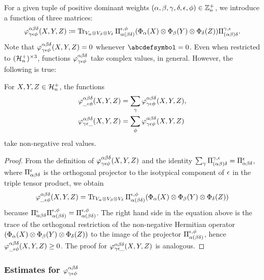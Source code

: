 \documentclass[notitlepage, 11pt, letterpaper]{amsart}
\begin{document}
For a given tuple of positive dominant weights $(\alpha,\beta,\gamma,\delta,\epsilon,\phi) \in \mathbb Z^{+}_{n}$, we introduce a function of three matrices:
\begin{equation}
    \varphi^{\alpha \beta \delta}_{\gamma \epsilon \phi}(X, Y, Z)
    \coloneqq
    \operatorname{Tr}_{V_\alpha \otimes V_\beta \otimes V_\delta}
    \Pi_{\alpha (\beta \delta)}^{\epsilon, \phi} (\Phi_\alpha(X) \otimes \Phi_\beta(Y) \otimes \Phi_\delta(Z))\Pi_{(\alpha \beta) \delta}^{\gamma, \epsilon}.
\end{equation}
Note that $\varphi^{\alpha \beta \delta}_{\gamma \epsilon \phi}(X,Y,Z) = 0$ whenever $\abcdefsymbol = 0$.
Even when restricted to $(\mathcal H^{+}_{n})^{\times 3}$, functions $\varphi^{\alpha \beta \delta}_{\gamma \epsilon \phi}$ take complex values, in general.
However, the following is true:
\begin{prop}
    \label{prop:non_neg_partial}
    For $X,Y,Z \in \mathcal H^{+}_{n}$, the functions
    \begin{align}
        \begin{split}
            \varphi^{\alpha\beta\delta}_{\_ \epsilon\phi}(X,Y,Z) & = \sum_{\gamma}\varphi^{\alpha\beta\delta}_{\gamma\epsilon\phi}(X,Y,Z), \\
            \varphi^{\alpha\beta\delta}_{\gamma\epsilon \_}(X,Y,Z) & = \sum_{\phi}\varphi^{\alpha\beta\delta}_{\gamma\epsilon\phi}(X,Y,Z)
        \end{split}
    \end{align}
    take non-negative real values.
\end{prop}
\begin{proof}
    From the definition of $\varphi^{\alpha \beta \delta}_{\gamma \epsilon \phi}(X, Y, Z)$ and the identity $\sum_\gamma \Pi_{(\alpha \beta) \delta}^{\gamma, \epsilon} = \Pi^\epsilon_{\alpha \beta \delta}$, where $\Pi^\epsilon_{\alpha \beta \delta}$ is the orthogonal projector to the isotypical component of $\epsilon$ in the triple tensor product, we obtain
    \begin{align}
        \begin{split}
            \varphi^{\alpha\beta\delta}_{\_ \epsilon\phi}(X,Y,Z)
            =
            \operatorname{Tr}_{V_\alpha \otimes V_\beta \otimes V_\delta} \Pi_{\alpha (\beta \delta)}^{\epsilon, \phi} (\Phi_\alpha(X) \otimes \Phi_\beta(Y) \otimes \Phi_\delta(Z))
        \end{split}
    \end{align}
    because $\Pi^\epsilon_{\alpha \beta \delta} \Pi_{\alpha (\beta \delta)}^{\epsilon, \phi} = \Pi_{\alpha (\beta \delta)}^{\epsilon, \phi}$.
    The right hand side in the equation above is the trace of the orthogonal restriction of the non-negative Hermitian operator $(\Phi_\alpha(X) \otimes \Phi_\beta(Y) \otimes \Phi_\delta(Z))$ to the image of the projector $\Pi_{\alpha (\beta \delta)}^{\epsilon, \phi}$, hence $\varphi^{\alpha\beta\delta}_{\_ \epsilon\phi}(X,Y,Z) \geq 0$.
    The proof for $\varphi^{\alpha\beta\delta}_{\gamma\epsilon \_}(X,Y,Z)$ is analogous.
\end{proof}

\subsubsection{Estimates for \texorpdfstring{$\varphi^{\alpha \beta \delta}_{\gamma \epsilon \phi}$}{phiabcdef}}
\end{document}
